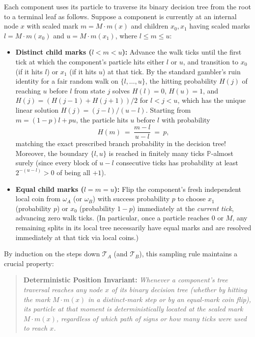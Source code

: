 \documentclass[11pt,letterpaper]{article}
\begin{document}
Each component uses its particle to traverse its binary decision tree from the root to a terminal leaf as follows. Suppose a component is currently at an internal node $x$ with scaled mark $m=M\cdot m(x)$ and children $x_0,x_1$ having scaled marks $l=M\cdot m(x_0)$ and $u=M\cdot m(x_1)$, where $l\le m\le u$:
\begin{itemize}
\item \textbf{Distinct child marks ($l < m < u$):} Advance the walk ticks until the first tick at which the component's particle hits either $l$ or $u$, and transition to $x_0$ (if it hits $l$) or $x_1$ (if it hits $u$) at that tick. By the standard gambler's ruin identity for a fair random walk on $\{l,\ldots,u\}$, the hitting probability $H(j)$ of reaching $u$ before $l$ from state $j$ solves $H(l)=0$, $H(u)=1$, and $H(j)=(H(j-1)+H(j+1))/2$ for $l<j<u$, which has the unique linear solution $H(j)=(j-l)/(u-l)$. Starting from $m=(1-p)l+pu$, the particle hits $u$ before $l$ with probability
\[
  H(m)\ =\ \frac{m-l}{u-l}\ =\ p,
\]
matching the exact prescribed branch probability in the decision tree! Moreover, the boundary $\{l,u\}$ is reached in finitely many ticks $\mathbb P$-almost surely (since every block of $u-l$ consecutive ticks has probability at least $2^{-(u-l)}>0$ of being all $+1$).
\item \textbf{Equal child marks ($l = m = u$):} Flip the component's fresh independent local coin from $\omega_A$ (or $\omega_B$) with success probability $p$ to choose $x_1$ (probability $p$) or $x_0$ (probability $1-p$) immediately at the \emph{current tick}, advancing zero walk ticks. (In particular, once a particle reaches $0$ or $M$, any remaining splits in its local tree necessarily have equal marks and are resolved immediately at that tick via local coins.)
\end{itemize}

By induction on the steps down $\mathcal T_A$ (and $\mathcal T_B$), this sampling rule maintains a crucial property:
\begin{quote}
\textbf{Deterministic Position Invariant:} \emph{Whenever a component's tree traversal reaches any node $x$ of its binary decision tree (whether by hitting the mark $M\cdot m(x)$ in a distinct-mark step or by an equal-mark coin flip), its particle at that moment is deterministically located at the scaled mark $M\cdot m(x)$, regardless of which path of signs or how many ticks were used to reach $x$.}
\end{quote}
\end{document}
